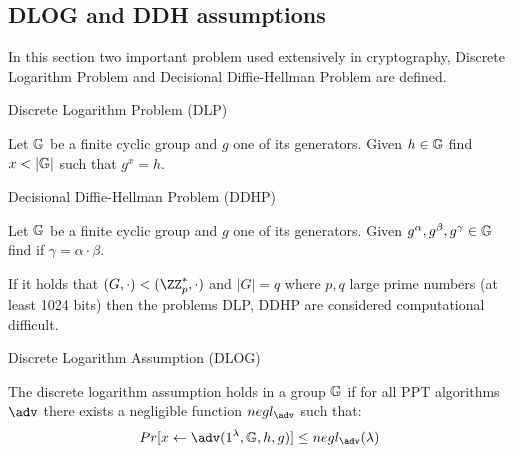 \subsection{DLOG and DDH assumptions}
In this section two important problem used extensively in cryptography, Discrete Logarithm Problem and Decisional Diffie-Hellman Problem are defined.

\begin{definition}\label{def:dlog-prolem} 
    Discrete Logarithm Problem (DLP)

    Let $\mathbb{G}$ be a finite cyclic group and $g$ one of its generators.
    Given $h \in \mathbb{G}$ find $x < |\mathbb{G}|$ such that $g^x = h$.
\end{definition}

\begin{definition}\label{def:ddh-problem} 
    Decisional Diffie-Hellman Problem (DDHP)

    Let $\mathbb{G}$ be a finite cyclic group and $g$ one of its generators.
    Given $g^\alpha, g^\beta, g^\gamma \in \mathbb{G}$ find if $\gamma = \alpha \cdot \beta$.
\end{definition}

If it holds that $(G, \cdot) < (\ZZ_p^*, \cdot)$ and $|G| = q$ where $p,q$ large prime numbers (at least 1024 bits) then the problems DLP, DDHP are considered computational difficult.

\begin{definition}\label{def:dlog-assumption}
    Discrete Logarithm Assumption (DLOG)

    The discrete logarithm assumption holds in a group $\mathbb{G}$ if for all PPT algorithms $\adv$ there exists a negligible function $negl_\adv$ such that:
    \begin{equation*}
        Pr[x \gets \adv(1^\lambda, \group, h,g)] \leq negl_{\adv}(\lambda)
    \end{equation*}
\end{definition}